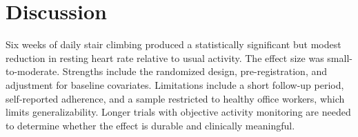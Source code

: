 \documentclass[11pt]{article}
\begin{document}
\section*{Discussion}

Six weeks of daily stair climbing produced a statistically significant but modest reduction in resting heart rate relative to usual activity. The effect size was small-to-moderate. Strengths include the randomized design, pre-registration, and adjustment for baseline covariates. Limitations include a short follow-up period, self-reported adherence, and a sample restricted to healthy office workers, which limits generalizability. Longer trials with objective activity monitoring are needed to determine whether the effect is durable and clinically meaningful.
\end{document}
